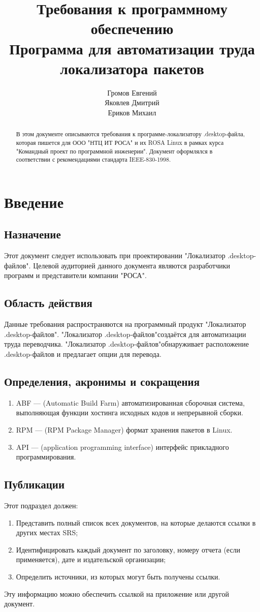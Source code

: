 \documentclass[a4paper,10pt]{report}
\title{Требования к программному обеспечению \\ Программа для автоматизации труда локализатора пакетов \rosalinux \\ \ldf}
\author{Громов Евгений \\ Яковлев Дмитрий \\ Ериков Михаил}
\newcommand{\ldf}{"Локализатор .desktop-файлов"}
\newcommand{\df}{.desktop-файл}
\newcommand{\rosalab}{ООО "НТЦ ИТ РОСА"}
\newcommand{\rosa}{"РОСА"}
\newcommand{\rosalinux}{ROSA Linux}
\newcommand{\ieee}{IEEE-830-1998}
\begin{document}
\maketitle

\begin{abstract}
В этом документе описываются требования к программе-локализатору {\df}а, которая пишется для {\rosalab} и их {\rosalinux} в рамках курса "Командный проект по программной инженерии". Документ оформлялся в соответствии с рекомендациями стандарта \ieee.
\end{abstract}

\tableofcontents

\chapter{Введение}	
\section{Назначение}
Этот документ следует использовать при проектировании \ldf. Целевой аудиторией данного документа являются разработчики программ и представители компании \rosa.

\section{Область действия}
Данные требования распространяются на программный продукт \ldf. \ldf создаётся для автоматизации труда переводчика. \ldf обнаруживает расположение {\df}ов и предлагает опции для перевода.

\section{Определения, акронимы и сокращения}
\begin{enumerate}
	\item ABF --- (Automatic Build Farm) автоматизированная сборочная система, выполняющая функции хостинга исходных кодов и непрерывной сборки.
	\item RPM --- (RPM Package Manager) формат хранения пакетов в Linux.
	\item API --- (application programming interface)  интерфейс прикладного программирования.
\end{enumerate}

\section{Публикации}
Этот подраздел должен:
\begin{enumerate}
	\item Представить полный список всех документов, на которые делаются ссылки в других местах SRS;
	\item Идентифицировать каждый документ по заголовку, номеру отчета (если применяется), дате и издательской организации;
	\item Определить источники, из которых могут быть получены ссылки.
\end{enumerate}	
Эту информацию можно обеспечить ссылкой на приложение или другой документ.
\end{document}
